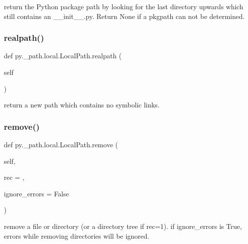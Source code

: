 \begin{DoxyVerb}return the Python package path by looking for the last
directory upwards which still contains an __init__.py.
Return None if a pkgpath can not be determined.
\end{DoxyVerb}
 \mbox{\label{classpy_1_1__path_1_1local_1_1_local_path_a2ddddaaee824f9ed74f9e670ab7b52cc}} 
\subsubsection{\texorpdfstring{realpath()}{realpath()}}
{\footnotesize\ttfamily def py.\+\_\+path.\+local.\+Local\+Path.\+realpath (\begin{DoxyParamCaption}\item[{}]{self }\end{DoxyParamCaption})}

\begin{DoxyVerb}return a new path which contains no symbolic links.\end{DoxyVerb}
 \mbox{\label{classpy_1_1__path_1_1local_1_1_local_path_a7d620282a5d34284a50b14458236c339}} 
\subsubsection{\texorpdfstring{remove()}{remove()}}
{\footnotesize\ttfamily def py.\+\_\+path.\+local.\+Local\+Path.\+remove (\begin{DoxyParamCaption}\item[{}]{self,  }\item[{}]{rec = {},  }\item[{}]{ignore\+\_\+errors = {\ttfamily False} }\end{DoxyParamCaption})}

\begin{DoxyVerb}remove a file or directory (or a directory tree if rec=1).
if ignore_errors is True, errors while removing directories will
be ignored.
\end{DoxyVerb}
 \mbox{\label{classpy_1_1__path_1_1local_1_1_local_path_aa8d0874d1ae4f9a13c5b8a2843cf4032}} 
